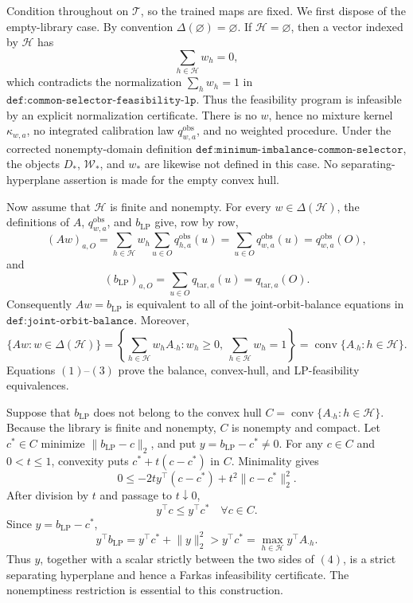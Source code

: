 Condition throughout on \(\mathcal T\), so the trained maps are fixed. We first dispose of the empty-library case. By convention \(\Delta(\varnothing)=\varnothing\). If \(\mathcal H=\varnothing\), then a vector indexed by \(\mathcal H\) has
\[
\sum_{h\in\mathcal H}w_h=0,
\]
which contradicts the normalization \(\sum_h w_h=1\) in \(\texttt{def:common-selector-feasibility-lp}\). Thus the feasibility program is infeasible by an explicit normalization certificate. There is no \(w\), hence no mixture kernel \(\kappa_{w,a}\), no integrated calibration law \(q^{\mathrm{obs}}_{w,a}\), and no weighted procedure. Under the corrected nonempty-domain definition \(\texttt{def:minimum-imbalance-common-selector}\), the objects \(D_*\), \(\mathcal W_*\), and \(w_*\) are likewise not defined in this case. No separating-hyperplane assertion is made for the empty convex hull.

Now assume that \(\mathcal H\) is finite and nonempty. For every \(w\in\Delta(\mathcal H)\), the definitions of \(A\), \(q^{\mathrm{obs}}_{w,a}\), and \(b_{\mathrm{LP}}\) give, row by row,
\[
(Aw)_{a,O}=\sum_{h\in\mathcal H}w_h\sum_{u\in O}q^{\mathrm{obs}}_{h,a}(u)=\sum_{u\in O}q^{\mathrm{obs}}_{w,a}(u)=q^{\mathrm{obs}}_{w,a}(O),\tag{1}
\]
and
\[
(b_{\mathrm{LP}})_{a,O}=\sum_{u\in O}q_{\mathrm{tar},a}(u)=q_{\mathrm{tar},a}(O).\tag{2}
\]
Consequently \(Aw=b_{\mathrm{LP}}\) is equivalent to all of the joint-orbit-balance equations in \(\texttt{def:joint-orbit-balance}\). Moreover,
\[
\{Aw:w\in\Delta(\mathcal H)\}=\left\{\sum_{h\in\mathcal H}w_hA_{\cdot h}:w_h\ge0,\ \sum_{h\in\mathcal H}w_h=1\right\}=\operatorname{conv}\{A_{\cdot h}:h\in\mathcal H\}.\tag{3}
\]
Equations \((1)\)--\((3)\) prove the balance, convex-hull, and LP-feasibility equivalences.

Suppose that \(b_{\mathrm{LP}}\) does not belong to the convex hull \(C=\operatorname{conv}\{A_{\cdot h}:h\in\mathcal H\}\). Because the library is finite and nonempty, \(C\) is nonempty and compact. Let \(c^*\in C\) minimize \(\lVert b_{\mathrm{LP}}-c\rVert_2\), and put \(y=b_{\mathrm{LP}}-c^*\ne0\). For any \(c\in C\) and \(0<t\le1\), convexity puts \(c^*+t(c-c^*)\) in \(C\). Minimality gives
\[
0\le-2t y^\top(c-c^*)+t^2\lVert c-c^*\rVert_2^2.
\]
After division by \(t\) and passage to \(t\downarrow0\),
\[
y^\top c\le y^\top c^*\quad\forall c\in C.
\]
Since \(y=b_{\mathrm{LP}}-c^*\),
\[
y^\top b_{\mathrm{LP}}=y^\top c^*+\lVert y\rVert_2^2>y^\top c^*=\max_{h\in\mathcal H}y^\top A_{\cdot h}.\tag{4}
\]
Thus \(y\), together with a scalar strictly between the two sides of \((4)\), is a strict separating hyperplane and hence a Farkas infeasibility certificate. The nonemptiness restriction is essential to this construction.

